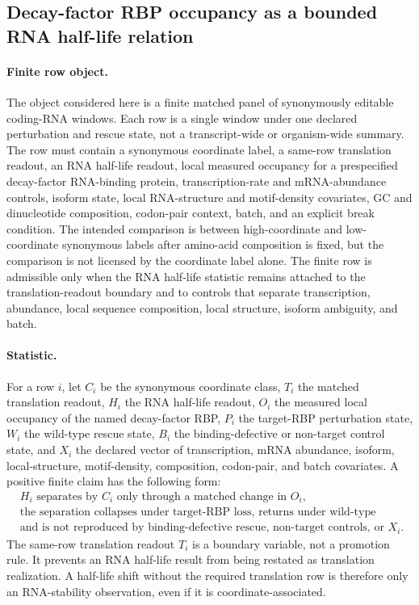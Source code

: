 \subsection{Decay-factor RBP occupancy as a bounded RNA half-life relation}\label{bio:decay-factor-rbp-rna-half-life-with-translation-boundary-cross-layer}

\paragraph{Finite row object.} The object considered here is a finite matched panel of synonymously editable coding-RNA windows. Each row is a single window under one declared perturbation and rescue state, not a transcript-wide or organism-wide summary. The row must contain a synonymous coordinate label, a same-row translation readout, an RNA half-life readout, local measured occupancy for a prespecified decay-factor RNA-binding protein, transcription-rate and mRNA-abundance controls, isoform state, local RNA-structure and motif-density covariates, GC and dinucleotide composition, codon-pair context, batch, and an explicit break condition. The intended comparison is between high-coordinate and low-coordinate synonymous labels after amino-acid composition is fixed, but the comparison is not licensed by the coordinate label alone. The finite row is admissible only when the RNA half-life statistic remains attached to the translation-readout boundary and to controls that separate transcription, abundance, local sequence composition, local structure, isoform ambiguity, and batch.

\paragraph{Statistic.} For a row $i$, let $C_i$ be the synonymous coordinate class, $T_i$ the matched translation readout, $H_i$ the RNA half-life readout, $O_i$ the measured local occupancy of the named decay-factor RBP, $P_i$ the target-RBP perturbation state, $W_i$ the wild-type rescue state, $B_i$ the binding-defective or non-target control state, and $X_i$ the declared vector of transcription, mRNA abundance, isoform, local-structure, motif-density, composition, codon-pair, and batch covariates. A positive finite claim has the following form:
$$
\begin{aligned}
&H_i \text{ separates by } C_i \text{ only through a matched change in } O_i,\\
&\text{the separation collapses under target-RBP loss, returns under wild-type rescue,}\\
&\text{and is not reproduced by binding-defective rescue, non-target controls, or } X_i.
\end{aligned}
$$
The same-row translation readout $T_i$ is a boundary variable, not a promotion rule. It prevents an RNA half-life result from being restated as translation realization. A half-life shift without the required translation row is therefore only an RNA-stability observation, even if it is coordinate-associated.

